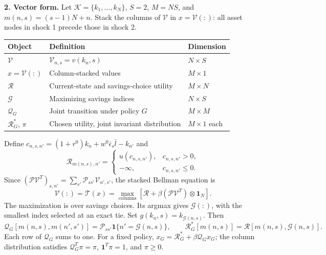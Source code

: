 \documentclass[11pt]{article}
\newcommand{\V}{\mathcal V}
\newcommand{\R}{\mathcal R}
\newcommand{\G}{\mathcal G}
\newcommand{\Q}{\mathcal Q}
\newcommand{\PP}{\mathcal P}
\begin{document}
\textbf{2. Vector form.}
Let $\mathcal K=\{k_1,\ldots,k_N\}$, $S=2$, $M=NS$, and
$m(n,s)=(s-1)N+n$. Stack the columns of $\V$ in $x=\V(:)$:
all asset nodes in shock 1 precede those in shock 2.
\begin{center}
\begin{tabular}{lll}
\toprule
Object & Definition & Dimension\\
\midrule
$\V$ & $\V_{n,s}=v(k_n,s)$ & $N\times S$\\
$x=\V(:)$ & Column-stacked values & $M\times1$\\
$\R$ & Current-state and savings-choice utility & $M\times N$\\
$\G$ & Maximizing savings indices & $N\times S$\\
$\Q_G$ & Joint transition under policy $G$ & $M\times M$\\
$\R_G^*$, $\pi$ & Chosen utility, joint invariant distribution & $M\times1$ each\\
\bottomrule
\end{tabular}
\end{center}
Define $c_{n,s,n'}=(1+r^0)k_n+w^0\bar\epsilon_s\bar l-k_{n'}$ and
\[
\R_{m(n,s),n'}=
\begin{cases}
u(c_{n,s,n'}),& c_{n,s,n'}>0,\\
-\infty,&c_{n,s,n'}\leq0.
\end{cases}
\]
Since $(\PP\V^T)_{s,n'}=\sum_{s'}\PP_{ss'}\V_{n',s'}$, the stacked Bellman equation is
\begin{equation}
\boxed{\V(:)=\mathcal T(x)=\max_{\mathrm{columns}}
\left[\R+\beta(\PP\V^T)\otimes\mathbf1_N\right].}
\end{equation}
The maximization is over savings choices. Its argmax gives $\G(:)$, with the smallest
index selected at an exact tie. Set $g(k_n,s)=k_{\G(n,s)}$. Then
\begin{equation}
\Q_G[m(n,s),m(n',s')]=\PP_{ss'}\mathbf1\{n'=\G(n,s)\},
\qquad \R_G^*[m(n,s)]=\R[m(n,s),\G(n,s)].
\end{equation}
Each row of $\Q_G$ sums to one. For a fixed policy,
$x_G=\R_G^*+\beta\Q_Gx_G$; the column distribution satisfies
$\Q_G^T\pi=\pi$, $\mathbf1^T\pi=1$, and $\pi\geq0$.
\end{document}

